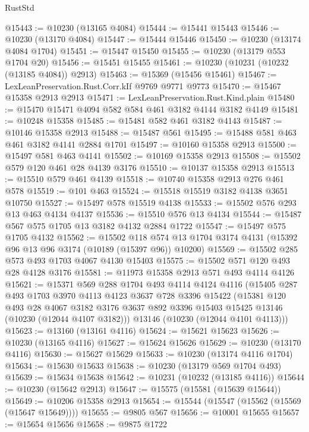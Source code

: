 \begin{lexlean}{RustStd}
\begin{coremodule}
@15443 := @10230 (@13165 @4084)
@15444 := @15441 @15443
@15446 := @10230 (@13170 @4084)
@15447 := @15444 @15446
@15450 := @10230 (@13174 @4084 @1704)
@15451 := @15447 @15450
@15455 := @10230 (@13179 @553 @1704 @20)
@15456 := @15451 @15455
@15461 := @10230 (@10231 (@10232 (@13185 @4084)) @2913)
@15463 := @15369 (@15456 @15461)
@15467 := LexLeanPreservation.Rust.Corr.kIf @9769 @9771 @9773
@15470 := @15467 @15358 @2913 @2913
@15471 := LexLeanPreservation.Rust.Kind.plain
@15480 := @15470 @15471 @4094 @582 @584 @461 @3182 @4144 @3182 @4149
@15481 := @10248 @15358
@15485 := @15481 @582 @461 @3182 @4143
@15487 := @10146 @15358 @2913
@15488 := @15487 @561
@15495 := @15488 @581 @463 @461 @3182 @4141 @2884 @1701
@15497 := @10160 @15358 @2913
@15500 := @15497 @581 @463 @4141
@15502 := @10169 @15358 @2913
@15508 := @15502 @579 @120 @461 @28 @4139 @3176
@15510 := @10137 @15358 @2913
@15513 := @15510 @579 @461 @4139
@15518 := @10740 @15358 @2913 @276 @461 @578
@15519 := @101 @463
@15524 := @15518 @15519 @3182 @4138 @3651 @10750
@15527 := @15497 @578 @15519 @4138
@15533 := @15502 @576 @293 @13 @463 @4134 @4137
@15536 := @15510 @576 @13 @4134
@15544 := @15487 @567 @575 @1705 @13 @3182 @4132 @2884 @1722
@15547 := @15497 @575 @1705 @4132
@15562 := @15502
    @118
    @574
    @13
    @1704
    @3174
    @4131
    (@15392 @96 @13 @96 @3174 (@10189 (@15397 @96)) @10200)
@15569 := @15502 @285 @573 @493 @1703 @4067 @4130 @15403
@15575 := @15502 @571 @120 @493 @28 @4128 @3176
@15581 := @11973 @15358 @2913 @571 @493 @4114 @4126
@15621 := @15371
    @569
    @288
    @1704
    @493
    @4114
    @4124
    @4116
    (@15405
      @287
      @493
      @1703
      @3970
      @4113
      @4123
      @3637
      @728
      @3396
      @15422
      (@15381
        @120
        @493
        @28
        @4067
        @3182
        @3176
        @3637
        @892
        @3396
        @15403
        @15425
        @13146
        (@10230 (@12044 @4107 @3182)))
      @13146
      (@10230 (@12044 @4101 @4113)))
@15623 := @13160 (@13161 @4116)
@15624 := @15621 @15623
@15626 := @10230 (@13165 @4116)
@15627 := @15624 @15626
@15629 := @10230 (@13170 @4116)
@15630 := @15627 @15629
@15633 := @10230 (@13174 @4116 @1704)
@15634 := @15630 @15633
@15638 := @10230 (@13179 @569 @1704 @493)
@15639 := @15634 @15638
@15642 := @10231 (@10232 (@13185 @4116))
@15644 := @10230 (@15642 @2913)
@15647 := @15575 (@15581 (@15639 @15644))
@15649 := @10206 @15358 @2913
@15654 := @15544 (@15547 (@15562 (@15569 (@15647 @15649))))
@15655 := @9805 @567
@15656 := @10001 @15655
@15657 := @15654 @15656
@15658 := @9875 @1722

\end{coremodule}
\end{lexlean}
